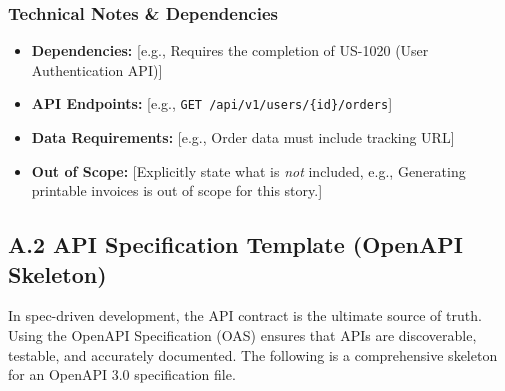 \subsubsection{Technical Notes \&
Dependencies}\label{technical-notes-dependencies}

\begin{itemize}
\tightlist
\item
  \textbf{Dependencies:} {[}e.g., Requires the completion of US-1020
  (User Authentication API){]}
\item
  \textbf{API Endpoints:} {[}e.g.,
  \texttt{GET\ /api/v1/users/\{id\}/orders}{]}
\item
  \textbf{Data Requirements:} {[}e.g., Order data must include tracking
  URL{]}
\item
  \textbf{Out of Scope:} {[}Explicitly state what is \emph{not}
  included, e.g., Generating printable invoices is out of scope for this
  story.{]}
\end{itemize}

\bigskip

\subsection{A.2 API Specification Template (OpenAPI
Skeleton)}\label{a.2-api-specification-template-openapi-skeleton}

In spec-driven development, the API contract is the ultimate source of
truth. Using the OpenAPI Specification (OAS) ensures that APIs are
discoverable, testable, and accurately documented. The following is a
comprehensive skeleton for an OpenAPI 3.0 specification file.

